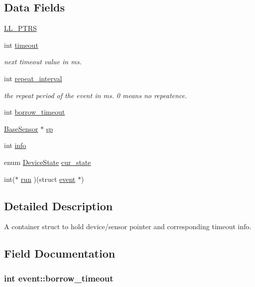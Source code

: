 \subsection*{Data Fields}
\begin{DoxyCompactItemize}
\item 
\hyperlink{structevent_a994b32d8396bd5e998df0956908ec79d}{L\-L\-\_\-\-P\-T\-R\-S}
\item 
int \hyperlink{structevent_a0da07c7694fd4b1e45c1cb5d65fb962b}{timeout}
\begin{DoxyCompactList}\small\item\em next timeout value in ms. \end{DoxyCompactList}\item 
int \hyperlink{structevent_a2792fb8dafb449872de1213c65c89474}{repeat\-\_\-interval}
\begin{DoxyCompactList}\small\item\em the repeat period of the event in ms. 0 means no repeatence. \end{DoxyCompactList}\item 
int \hyperlink{structevent_a956c9abffd9faff3f90040f464d2423e}{borrow\-\_\-timeout}
\item 
\hyperlink{_base___sensor_8h_ae91aa07b7bce6c6b463d63d8f214bb37}{Base\-Sensor} $\ast$ \hyperlink{structevent_a64304637019072f9322aef7ecf4a7c00}{sp}
\item 
int \hyperlink{structevent_aa6d0cb63c9eb781957c1db988d71d12f}{info}
\item 
enum \hyperlink{common_8h_a0c10345a5a61ea917f59a0437ad481a0}{Device\-State} \hyperlink{structevent_ad434572c03708c933947eb50f4bb5403}{cur\-\_\-state}
\item 
int($\ast$ \hyperlink{structevent_add5b35b1741734964a494b100224aaea}{run} )(struct \hyperlink{structevent}{event} $\ast$)
\end{DoxyCompactItemize}


\subsection{Detailed Description}
A container struct to hold device/sensor pointer and corresponding timeout info. 

\subsection{Field Documentation}
\hypertarget{structevent_a956c9abffd9faff3f90040f464d2423e}{
\subsubsection[{borrow\-\_\-timeout}]{\setlength{\rightskip}{0pt plus 5cm}int event\-::borrow\-\_\-timeout}}\label{structevent_a956c9abffd9faff3f90040f464d2423e}


